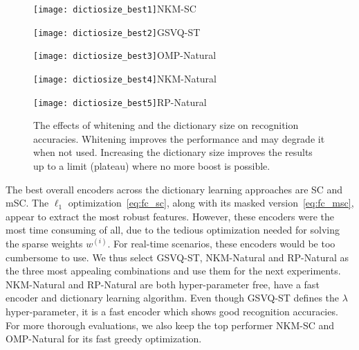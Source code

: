 \documentclass[svgnames]{scrartcl}
\begin{document}
\begin{figure}[t]
    \centering
    \begin{minipage}{0.3\textwidth}
        \centering
        \texttt{[image: dictiosize\_best1]}{\scriptsize NKM-SC}
    \end{minipage}%
    \begin{minipage}{0.3\textwidth}
        \centering
        \texttt{[image: dictiosize\_best2]}{\scriptsize GSVQ-ST}
    \end{minipage}%
    \begin{minipage}{0.3\textwidth}
        \centering
        \texttt{[image: dictiosize\_best3]}{\scriptsize OMP-Natural}
    \end{minipage}%
    
    \begin{minipage}{0.3\textwidth}
        \centering
        \texttt{[image: dictiosize\_best4]}{\scriptsize NKM-Natural}
    \end{minipage}%
    \begin{minipage}{0.3\textwidth}
        \centering
        \texttt{[image: dictiosize\_best5]}{\scriptsize RP-Natural}
    \end{minipage}%
    \caption{The effects of whitening and the dictionary size on recognition accuracies. Whitening improves the performance and may degrade it when not used. Increasing the dictionary size improves the results up to a limit (plateau) where no more boost is possible.} %
    \label{fig:dictiosize}
\end{figure}

The best overall encoders across the dictionary learning approaches are SC and mSC. The $\ell_1$ optimization~\eqref{eq:fc_sc}, along with its masked version~\eqref{eq:fc_msc}, appear to extract the most robust features. However, these encoders were the most time consuming of all, due to the tedious optimization needed for solving the sparse weights $w^{(i)}$. For real-time scenarios, these encoders would be too cumbersome to use. We thus select GSVQ-ST, NKM-Natural and RP-Natural as the three most appealing combinations and use them for the next experiments. NKM-Natural and RP-Natural are both hyper-parameter free, have a fast encoder and dictionary learning algorithm. Even though GSVQ-ST defines the $\lambda$ hyper-parameter, it is a fast encoder which shows good recognition accuracies. For more thorough evaluations, we also keep the top performer NKM-SC and OMP-Natural for its fast greedy optimization.
\end{document}
